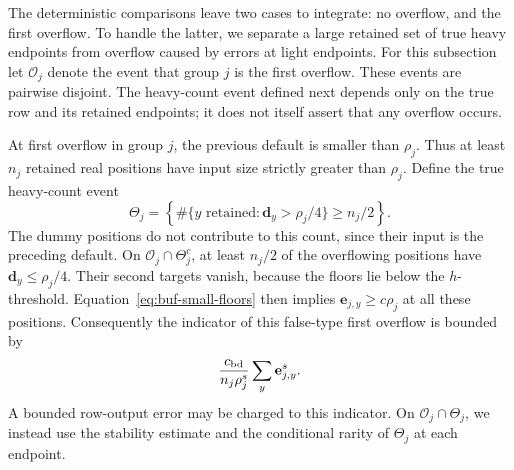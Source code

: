 \documentclass[11pt]{article}
\numberwithin{equation}{section}
\theoremstyle{definition}
\theoremstyle{remark}
\begin{document}
The deterministic comparisons leave two cases to integrate: no overflow,
and the first overflow.  To handle the latter, we separate a large retained
set of true heavy endpoints from overflow caused by errors at light
endpoints.
For this subsection let $\mathcal O_j$ denote the event that group $j$
is the first overflow.  These events are pairwise disjoint.  The
heavy-count event defined next depends only on the true row and its
retained endpoints; it does not itself assert that any overflow occurs.

At first overflow in group $j$, the previous default is smaller than
$\rho_j$.  Thus at least $n_j$ retained real positions have input size
strictly greater than $\rho_j$.  Define the true heavy-count event
\[
 \Theta_j=\left\{\#\{y\text{ retained}:{\mathbf{d}}_y>\rho_j/4\}\geq n_j/2\right\}.
\]
The dummy positions do not contribute to this count, since their input
is the preceding default.  On $\mathcal O_j\cap\Theta_j^c$, at least
$n_j/2$ of the overflowing positions have
${\mathbf{d}}_y\leq\rho_j/4$.  Their second targets vanish, because the floors lie
below the $h$-threshold.  Equation~\eqref{eq:buf-small-floors} then implies
$\mathbf e_{j,y}\geq c\rho_j$ at all these positions.  Consequently the indicator
of this false-type first overflow is bounded by
\begin{equation}
 \frac{{c_{\rm bd}}}{n_j\rho_j^s}\sum_y \mathbf e_{j,y}^s.
 \label{eq:buf-false-charge}
\end{equation}
A bounded row-output error may be charged to this indicator.
On $\mathcal O_j\cap\Theta_j$, we instead use the stability estimate
and the conditional rarity of $\Theta_j$ at each endpoint.
\end{document}
